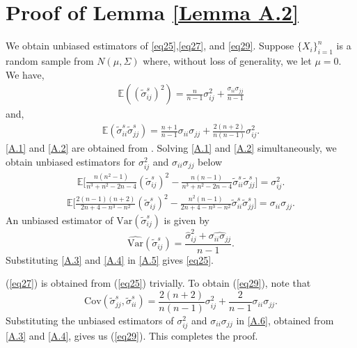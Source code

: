 \documentclass[11pt,oneside]{amsart}
\begin{document}
\section{Proof of Lemma \ref{Lemma A.2}}
We obtain unbiased estimators of \eqref{eq25},\eqref{eq27}, and \eqref{eq29}. 
Suppose $\{X_i\}_{i=1}^{n}$ is a random sample from $N(\mu, \Sigma)$ where, without loss of generality, we let $\mu = 0$. We have, 
\begin{align} \label{A.1}
{\mathbb{E}}(({\widetilde{\sigma}}_{ij}^{s})^{2})  = \frac{n}{n-1}{\sigma_{ij}^{2}} + \frac{\sigma_{ii}\sigma_{jj}}{n-1} 
\end{align}
and, 
\begin{align} \label{A.2}
{\mathbb{E}}({\widetilde{\sigma}}_{ii}^{s}{\widetilde{\sigma}}_{jj}^{s}) = \frac{n+1}{n-1}{\sigma_{ii}\sigma_{jj}} + \frac{2(n+2)}{n(n-1)}{\sigma_{ij}^{2}}. 
\end{align} 
\eqref{A.1} and \eqref{A.2} are obtained from \citet{yi2013sure}. Solving \eqref{A.1} and \eqref{A.2} simultaneously, we obtain unbiased estimators for ${\sigma_{ij}^{2}}$ and ${\sigma_{ii}\sigma_{jj}}$ below
\small \begin{align} \label{A.3}
{\mathbb{E}}\bigg[\frac{n(n^2 - 1)}{n^3 + n^2 - 2n -4}({\widetilde{\sigma}}_{ij}^{s})^{2} - \frac{n(n - 1)}{n^3 + n^2 - 2n -4}{\widetilde{\sigma}}_{ii}^{s}{\widetilde{\sigma}}_{jj}^{s}\bigg] = {\sigma_{ij}^{2}}. 
\end{align} 
\small\begin{align} \label{A.4}
{\mathbb{E}}\bigg[\frac{2(n-1)(n+2)}{2n + 4 - n^3 - n^2}({\widetilde{\sigma}}_{ij}^{s})^{2} - \frac{n^2(n - 1)}{2n + 4 - n^3 - n^2}{\widetilde{\sigma}}_{ii}^{s}{\widetilde{\sigma}}_{jj}^{s}\bigg] =  {\sigma_{ii}}{\sigma_{jj}}.
\end{align} 
An unbiased estimator of ${\mbox{Var}}({\widetilde{\sigma}}_{ij}^{s})$ is given by 
\begin{equation} \label{A.5}
\widehat{\mbox{Var}}({\widetilde{\sigma}}_{ij}^{s}) = \frac{{\widehat{\sigma}}_{ij}^{2} + {\widehat{\sigma_{ii}\sigma_{jj}}}}{n - 1}. 
\end{equation} 
Substituting \eqref{A.3} and \eqref{A.4} in \eqref{A.5} gives \eqref{eq25}.

(\ref{eq27}) is obtained from (\ref{eq25}) trivially. To obtain (\ref{eq29}), note that 
\begin{equation} \label{A.6}
{\mbox{Cov}}({\widetilde{\sigma}}_{jj}^{s}, {\widetilde{\sigma}}_{ii}^{s}) = \frac{2(n + 2)}{n(n - 1)}{\sigma_{ij}^{2}} + \frac{2}{n - 1}{\sigma_{ii}}{\sigma_{jj}}.
\end{equation} 
Substituting the unbiased estimators of ${\sigma}_{ij}^{2}$ and ${\sigma_{ii}}{\sigma_{jj}}$ in \eqref{A.6}, obtained from \eqref{A.3} and \eqref{A.4}, gives us (\ref{eq29}). This completes the proof. 
\end{document}
